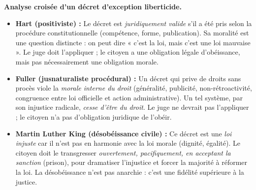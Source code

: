 \documentclass[11pt]{article}
\begin{document}
\begin{corrige}[Exercice 2]
\textbf{Analyse croisée d'un décret d'exception liberticide.}
\begin{itemize}
\item \textbf{Hart (positiviste) :} Le décret est \emph{juridiquement valide} s'il a été pris selon la procédure constitutionnelle (compétence, forme, publication). Sa moralité est une question distincte : on peut dire « c'est la loi, mais c'est une loi mauvaise ». Le juge doit l'appliquer ; le citoyen a une obligation légale d'obéissance, mais pas nécessairement une obligation morale.
\item \textbf{Fuller (jusnaturaliste procédural) :} Un décret qui prive de droits sans procès viole la \emph{morale interne du droit} (généralité, publicité, non-rétroactivité, congruence entre loi officielle et action administrative). Un tel système, par son injustice radicale, \emph{cesse d'être du droit}. Le juge ne devrait pas l'appliquer ; le citoyen n'a pas d'obligation juridique de l'obéir.
\item \textbf{Martin Luther King (désobéissance civile) :} Ce décret est une \emph{loi injuste} car il n'est pas en harmonie avec la loi morale (dignité, égalité). Le citoyen doit le transgresser \emph{ouvertement, pacifiquement, en acceptant la sanction} (prison), pour dramatiser l'injustice et forcer la majorité à réformer la loi. La désobéissance n'est pas anarchie : c'est une fidélité supérieure à la justice.
\end{itemize}
\end{corrige}
\end{document}
